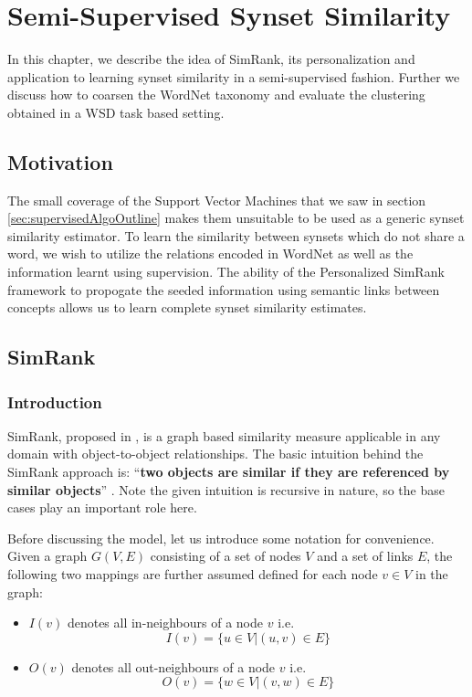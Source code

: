 \chapter{Semi-Supervised Synset Similarity}
\label{chapter:Semi-SupervisedSynsetSimilarity}
In this chapter, we describe the idea of SimRank, its personalization and application to learning synset similarity in a semi-supervised fashion. Further we discuss how to coarsen the WordNet taxonomy and evaluate the clustering obtained in a WSD task based setting.

\section{Motivation}
The small coverage of the Support Vector Machines that we saw in section \ref{sec:supervisedAlgoOutline} makes them unsuitable to be used as a generic synset similarity estimator. To learn the similarity between synsets which do not share a word, we wish to utilize the relations encoded in WordNet as well as the information learnt using supervision. 
The ability of the Personalized SimRank framework to propogate the seeded information using semantic links between concepts allows us to learn complete synset similarity estimates.

\section{SimRank}
\label{sec:SimRank}
\subsection{Introduction}
SimRank, proposed in \citep{Jeh02simrank}, is a graph based similarity measure applicable in any domain with object-to-object relationships. The basic intuition behind the SimRank approach is: ``\textbf{two objects are similar if they are referenced by similar objects}'' \citep{Jeh02simrank} \citep{LizorkinSimrank}. Note the given intuition is recursive in nature, so the base cases play an important role here.

Before discussing the model, let us introduce some notation for convenience. Given a graph $G(V,E)$ consisting of a set of nodes $V$ and a set of links $E$, the following two mappings are further assumed defined for each node $v \in V$ in the graph:
\begin{itemize}
\item $I(v)$ denotes all in-neighbours of a node $v$ i.e.
\begin{equation}
I(v) = \{u\in V | (u,v)\in E\}
\end{equation}
\item $O(v)$ denotes all out-neighbours of a node $v$ i.e.
\begin{equation}
O(v) = \{w\in V | (v,w)\in E\}
\end{equation}
\end{itemize}

